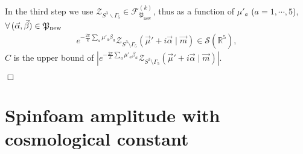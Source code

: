 \documentclass[aps,prd,notitlepage,nofootinbib,superscriptaddress,groupedaddress,twocolumn]{revtex4-1}
\def\R{\mathbb{R}}
\def\be{\begin{eqnarray}}
\def\ee{\end{eqnarray}}
\newcommand{\cf}{\mathcal F}
\newcommand{\cs}{\mathcal S}
\newcommand{\cz}{\mathcal Z}
\renewcommand{\a}{\alpha}
\renewcommand{\b}{\beta}
\newcommand{\G}{\Gamma}
\newcommand{\rmd}{\mathrm d}
\newcommand{\lt}{\left}
\newcommand{\rt}{\right}
\begin{document}
In the third step we use $\mathcal{Z}_{S^{3} \backslash \Gamma_{5}} \in \mathcal{F}_{\mathfrak{P}_{\text {new }}}^{(k)}$, thus as a function of $\mu'_a$ ($a=1,\cdots,5$), $\forall\, (\vec{\a},\vec{\b})\in \Fp_{\rm new}$
\be
e^{-\frac{2\pi}{k} \sum_a\mu'_a\b_a}\cz_{S^3\setminus\G_5}(\vec{\mu}'+i\vec{\a}\mid \vec{m})\in \cs(\R^{5}),
\ee
$C$ is the upper bound of $|e^{-\frac{2\pi}{k} \sum_a\mu'_a\b_a}\cz_{S^3\setminus\G_5}(\vec{\mu}'+i\vec{\a}\mid \vec{m})|$.



$\Box$ 



\section{Spinfoam amplitude with cosmological constant}\label{Spinfoam amplitude with cosmological constant}
\end{document}
